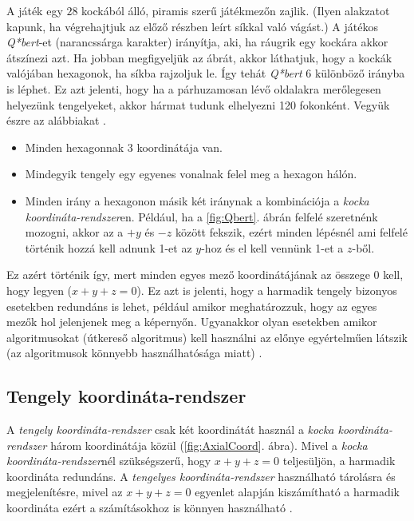 A játék egy $28$ kockából álló, piramis szerű játékmezőn zajlik. (Ilyen alakzatot kapunk, ha végrehajtjuk az előző részben leírt síkkal való vágást.) \newpage \noindent A játékos \textit{Q*bert}-et (narancssárga karakter) irányítja, aki, ha ráugrik egy kockára akkor átszínezi azt. Ha jobban megfigyeljük az ábrát, akkor láthatjuk, hogy a kockák valójában hexagonok, ha síkba rajzoljuk le. Így tehát \textit{Q*bert} 6 különböző irányba is léphet. Ez azt jelenti, hogy ha a párhuzamosan lévő oldalakra merőlegesen helyezünk tengelyeket, akkor hármat tudunk elhelyezni 120 fokonként. Vegyük észre az alábbiakat \cite{HexagonalGrids}.
\begin{itemize}
\item Minden hexagonnak 3 koordinátája van. 
\item Mindegyik tengely egy egyenes vonalnak felel meg a hexagon hálón.
\item Minden irány a hexagonon másik két iránynak a kombinációja a \textit{kocka koordináta-rendszer}en. Például, ha a \ref{fig:Qbert}. ábrán felfelé szeretnénk mozogni, akkor az a $+y$ és $-z$ között fekszik, ezért minden lépésnél ami felfelé történik hozzá kell adnunk 1-et az $y$-hoz és el kell vennünk 1-et a $z$-ből. 
\end{itemize}
Ez azért történik így, mert minden egyes mező koordinátájának az összege $0$ kell, hogy legyen ($x + y + z = 0$). Ez azt is jelenti, hogy a harmadik tengely bizonyos esetekben redundáns is lehet, például amikor meghatározzuk, hogy az egyes mezők hol jelenjenek meg a képernyőn. Ugyanakkor olyan esetekben amikor algoritmusokat (útkereső algoritmus) kell használni az előnye egyértelműen látszik (az algoritmusok könnyebb használhatósága miatt) \cite{Cube}. 

\subsection{Tengely koordináta-rendszer}

A \textit{tengely koordináta-rendszer} csak két koordinátát használ a \textit{kocka koordináta-rendszer} három koordinátája közül (\ref{fig:AxialCoord}. ábra). Mivel a \textit{kocka koordináta-rendszer}nél szükségszerű, hogy  $x + y + z = 0$ teljesüljön, a harmadik koordináta redundáns.  A \textit{tengelyes koordináta-rendszer} használható tárolásra és megjelenítésre, mivel az $x + y + z = 0$ egyenlet alapján kiszámítható a harmadik koordináta ezért a számításokhoz is könnyen használható \cite{Axial}.

